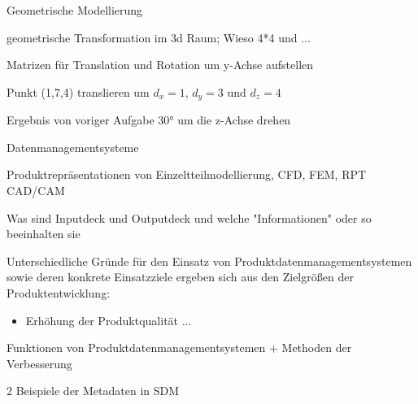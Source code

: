 \documentclass[
	ngerman,
	color = black,
	]{tudaexercise}
\begin{document}
\begin{task}[credit=9 P]{Geometrische Modellierung}
	\begin{subtask}[credit=2 P]
		geometrische Transformation im 3d Raum; Wieso 4*4 und ...
	\end{subtask}
	
	\begin{subtask}[credit=2 P]
		Matrizen für Translation und Rotation um y-Achse aufstellen
	\end{subtask}
		
	\begin{subtask}[credit=3 P]
		Punkt (1,7,4) translieren um $d_x=1$, $d_y=3$ und $d_z=4$
	\end{subtask}
	
	\begin{subtask}[credit=2 P]
		Ergebnis von voriger Aufgabe 30° um die z-Achse drehen
	\end{subtask}
\end{task}

\begin{task}[credit=15{,}5 P]{Datenmanagementsysteme}
	\begin{subtask}[credit=5 P]
		 Produktrepräsentationen von Einzeltteilmodellierung, CFD, FEM, RPT CAD/CAM
	\end{subtask}
	
	\begin{subtask}[credit=2 P]
		
	\end{subtask}
	
	\begin{subtask}[credit=2{,}5 P]
		Was sind Inputdeck und Outputdeck und welche "Informationen" oder so beeinhalten sie
	\end{subtask}
	
	Unterschiedliche Gründe für den Einsatz von Produktdatenmanagementsystemen sowie deren konkrete Einsatzziele ergeben sich aus den Zielgrößen der Produktentwicklung:
	\begin{itemize}
		\item Erhöhung der Produktqualität
		...
	\end{itemize} %
	
	\begin{subtask}[credit=4 P]
		Funktionen von Produktdatenmanagementsystemen
		+ Methoden der Verbesserung
	\end{subtask}
	
	\begin{subtask}[credit=2 P]
		2 Beispiele der Metadaten in SDM
	\end{subtask}
\end{task}
\end{document}
